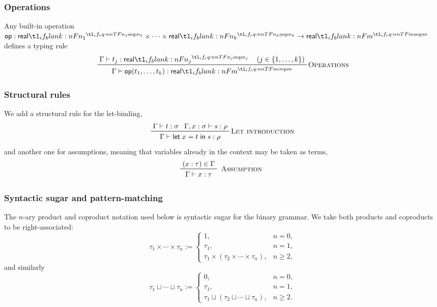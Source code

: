 \documentclass[11pt,a4paper]{article}
\theoremstyle{definition}
\theoremstyle{remark}
\providecommand{\srcop}{\mathsf{op}}
\providecommand{\letst}[3]{\mathsf{let}\;#1=#2\;\mathsf{in}\;#3}
\begin{document}
\subsubsection{Operations}

Any built-in operation \( \srcop: \srcreal[n_{1}] \times \cdots \times \srcreal[n_{k}] \to \srcreal[m] \) defines a typing rule
\begin{equation*}
\prftree[r]{\textsc{Operations}}{
\Gamma \vdash t_{j}: \srcreal[n_{j}]
\quad
\left( j \in \left\{ 1, \dots, k \right\} \right)
}{
\Gamma \vdash
\fn[n]{ \srcop }{ t_{1}, \dots, t_{k} } :
\srcreal[m]
}
\end{equation*}

\subsubsection{Structural rules}

We add a structural rule for the let-binding,
\begin{equation*}
  \prftree[r]{\textsc{Let introduction}}{
    \Gamma \vdash t: \sigma
  }{
    \Gamma, x : \sigma \vdash s : \rho
  }{
    \Gamma \vdash \letst{x}{t}{s} : \rho
  }
\end{equation*}
and another one for assumptions, meaning that variables already in the context may be taken as terms,
\begin{equation*}
  \prftree[r]{\textsc{ Assumption }}{
    \left( x : \tau \right) \in \Gamma
  }{
    \Gamma \vdash x : \tau
  }
\end{equation*}

\subsubsection{Syntactic sugar and pattern-matching}

The \(n\)-ary product and coproduct notation used below is syntactic
sugar for the binary grammar.  We take both products and coproducts to be
right-associated:
\[
  \tau_1 \times \cdots \times \tau_n
  :=
  \begin{cases}
    1, & n=0,\\
    \tau_1, & n=1,\\
    \tau_1 \times (\tau_2 \times \cdots \times \tau_n), & n\geq 2,
  \end{cases}
\]
and similarly
\[
  \tau_1 \sqcup \cdots \sqcup \tau_n
  :=
  \begin{cases}
    0, & n=0,\\
    \tau_1, & n=1,\\
    \tau_1 \sqcup (\tau_2 \sqcup \cdots \sqcup \tau_n), & n\geq 2.
  \end{cases}
\]
\end{document}
